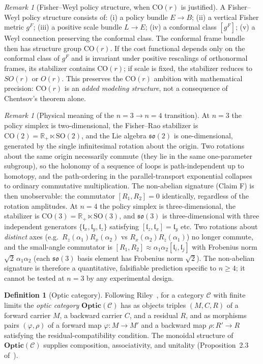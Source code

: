 \documentclass[11pt,a4paper]{article}
\theoremstyle{plain}
\theoremstyle{definition}
\newtheorem{definition}[theorem]{Definition}
\theoremstyle{remark}
\newtheorem{remark}[theorem]{Remark}
\newcommand{\CC}{\mathcal{C}}
\newcommand{\RR}{\mathbb{R}}
\newcommand{\SO}{\mathrm{SO}}
\newcommand{\CO}{\mathrm{CO}}
\newcommand{\so}{\mathfrak{so}}
\newcommand{\Optic}{\mathbf{Optic}}
\begin{document}
\begin{remark}[Fisher--Weyl policy structure, when $\CO(r)$ is justified]
\label{rem:fisher-weyl}
A Fisher--Weyl policy structure consists of: (i) a policy bundle
$E\to B$; (ii) a vertical Fisher metric $g^F$; (iii) a positive scale
bundle $L\to E$; (iv) a conformal class $[g^F]$; (v) a Weyl connection
preserving the conformal class. The conformal frame bundle then has
structure group $\CO(r)$. If the cost functional depends only on the
conformal class of $g^F$ and is invariant under positive rescalings of
orthonormal frames, its stabilizer contains $\CO(r)$; if scale is
fixed, the stabilizer reduces to $SO(r)$ or $O(r)$. This preserves the $\CO(r)$ ambition with mathematical precision: $\CO(r)$ is an
\emph{added modeling structure}, not a consequence of Chentsov's
theorem alone.
\end{remark}

\begin{remark}[Physical meaning of the $n=3\to n=4$ transition]
\label{rem:n3-n4}
At $n=3$ the policy simplex is two-dimensional, the Fisher--Rao
stabilizer is $\CO(2)=\RR_+\ltimes\SO(2)$, and the Lie algebra
$\so(2)$ is one-dimensional, generated by the single infinitesimal
rotation about the origin. Two rotations about the same origin
necessarily commute (they lie in the same one-parameter subgroup), so
the holonomy of a sequence of loops is path-independent up to
homotopy, and the path-ordering in the parallel-transport exponential
collapses to ordinary commutative multiplication. The non-abelian
signature (Claim F) is then unobservable: the commutator
$[R_1,R_2]=0$ identically, regardless of the rotation amplitudes.
At $n=4$ the policy simplex is three-dimensional, the stabilizer is
$\CO(3)=\RR_+\ltimes\SO(3)$, and $\so(3)$ is three-dimensional with
three independent generators $\{\mathfrak{l}_x,\mathfrak{l}_y,
\mathfrak{l}_z\}$ satisfying $[\mathfrak{l}_z,\mathfrak{l}_x]
=\mathfrak{l}_y$ etc. Two rotations about \emph{distinct} axes (e.g.\
$R_z(\alpha_1)R_x(\alpha_2)$ vs $R_x(\alpha_2)R_z(\alpha_1)$) no
longer commute, and the small-angle commutator is
$[R_1,R_2]\approx\alpha_1\alpha_2[\mathfrak{l}_i,\mathfrak{l}_j]$
with Frobenius norm $\sqrt{2}\,\alpha_1\alpha_2$ (each
$\so(3)$ basis element has Frobenius norm $\sqrt{2}$). The
non-abelian signature is therefore a quantitative, falsifiable
prediction specific to $n\geq 4$; it cannot be tested at $n=3$ by any
experimental design.
\end{remark}

\begin{definition}[Optic category]
\label{def:optic}
Following Riley~\cite{riley2018optics}, for a category $\CC$ with finite
limits the \emph{optic category} $\Optic(\CC)$ has as objects triples
$(M, C, R)$ of a forward carrier $M$, a backward carrier $C$, and a
residual $R$, and as morphisms pairs $(\varphi, \rho)$ of a forward map
$\varphi:M\to M'$ and a backward map $\rho:R'\to R$ satisfying the
residual-compatibility condition. The monoidal structure of
$\Optic(\CC)$ supplies composition, associativity, and unitality
(Proposition~2.3 of~\cite{riley2018optics}).
\end{definition}
\end{document}
